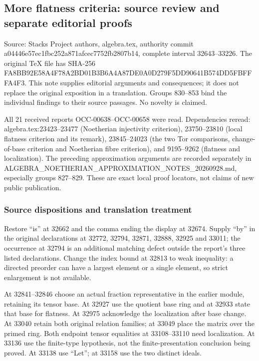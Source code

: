 \subsection{More flatness criteria: source review and separate editorial proofs}\label{algebra-proof-038-more-flatness-criteria-source-review-and-separate-editorial-proofs}

Source: Stacks Project authors, algebra.tex, authority commit a04446e57ec1fbc252a871afcec7752fb2807b14, complete interval 32643--33226. The original TeX file has SHA-256 FA8BB92E58A4F78A2BD01B3B6A4A87DE0A0D279F5DD90641B574DD5FBFFFA4F3. This note supplies editorial arguments and consequences; it does not replace the original exposition in a translation. Groups 830--853 bind the individual findings to their source passages. No novelty is claimed.

All 21 received reports OCC-00638--OCC-00658 were read. Dependencies reread: algebra.tex:23423--23477 (Noetherian injectivity criterion), 23750--23810 (local flatness criterion and its remark), 23845--24023 (the two Tor comparisons, change-of-base criterion and Noetherian fibre criterion), and 9195--9262 (flatness and localization). The preceding approximation arguments are recorded separately in ALGEBRA\_NOETHERIAN\_APPROXIMATION\_NOTES\_20260928.md, especially groups 827--829. These are exact local proof locators, not claims of new public publication.

\subsubsection{Source dispositions and translation treatment}\label{algebra-proof-038-source-dispositions-and-translation-treatment}

Restore ``is'' at 32662 and the comma ending the display at 32674. Supply ``by'' in the original declarations at 32772, 32794, 32871, 32888, 32925 and 33011; the occurrence at 32794 is an additional matching defect outside the report's three listed declarations. Change the index bound at 32813 to weak inequality: a directed preorder can have a largest element or a single element, so strict enlargement is not available.

At 32841--32846 choose an actual fraction representative in the earlier module, retaining its tensor base. At 32927 use the quotient base ring and at 32933 state that base for flatness. At 32975 acknowledge the localization after base change. At 33040 retain both original relation families; at 33049 place the matrix over the primed ring. Both endpoint tensor equalities at 33108--33110 need localization. At 33136 use the finite-type hypothesis, not the finite-presentation conclusion being proved. At 33138 use ``Let''; at 33158 use the two distinct ideals.

